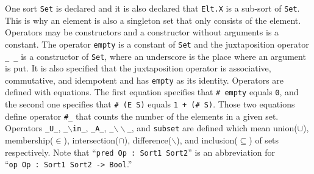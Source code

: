 \documentclass[12pt]{report}
\newcommand{\stt}[1]{{\small{\tt {#1}}}}
\begin{document}
One sort {\tt Set} is declared and it is also declared that
{\tt Elt.X} is a sub-sort of {\tt Set}. This is why an element is also
a singleton set that only consists of the element. Operators may be
constructors and a constructor without arguments is a constant. The
operator {\tt empty} is a constant of {\tt Set} and the juxtaposition
operator {\tt \_ \_} is a constructor of {\tt Set}, where an
underscore is the place where an argument is put. It is also specified
that the juxtaposition operator is associative, commutative, and
idempotent and has {\tt empty} as its identity. Operators are defined
with equations. The first equation specifies that \stt{\# empty} equals
{\tt 0}, and the second one specifies that \stt{\# (E S)} equals \stt{1
  + (\# S)}. Those two equations define operator {\tt \#\_} that
counts the number of the elements in a given set. Operators
{\tt \_U\_}, {\tt \_$\backslash$in\_}, {\tt \_A\_}, {\tt \_$\backslash\backslash$\_}, and {\tt subset} are
defined which mean union($\cup$), membership($\in$),
intersection($\cap$), difference($\backslash$), and inclusion($\subseteq$) of sets respectively.
Note that ``\stt{pred~Op~:~Sort1~Sort2}'' is an abbreviation for ``\stt{op~Op~:~Sort1~Sort2~->~Bool}.''
\end{document}
